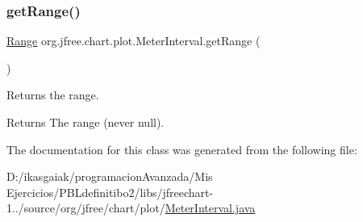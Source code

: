 \subsubsection{\texorpdfstring{get\+Range()}{getRange()}}
{\footnotesize\ttfamily \mbox{\hyperlink{classorg_1_1jfree_1_1data_1_1_range}{Range}} org.\+jfree.\+chart.\+plot.\+Meter\+Interval.\+get\+Range (\begin{DoxyParamCaption}{ }\end{DoxyParamCaption})}

Returns the range.

\begin{DoxyReturn}{Returns}
The range (never {\ttfamily null}). 
\end{DoxyReturn}


The documentation for this class was generated from the following file\+:\begin{DoxyCompactItemize}
\item 
D\+:/ikasgaiak/programacion\+Avanzada/\+Mis Ejercicios/\+P\+B\+Ldefinitibo2/libs/jfreechart-\/1../source/org/jfree/chart/plot/\mbox{\hyperlink{_meter_interval_8java}{Meter\+Interval.\+java}}\end{DoxyCompactItemize}
